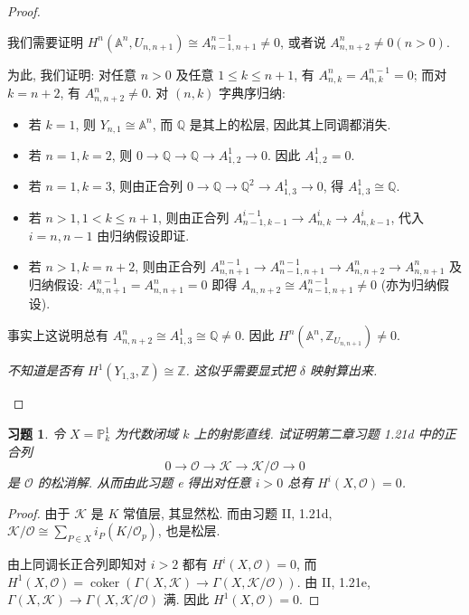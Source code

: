 \documentclass{article}
\theoremstyle{exercise}
\newtheorem{exercise}{习题}[section]
\theoremstyle{theorem}
\theoremstyle{remark}
\def\A{\mathbb{A}}
\def\P{\mathbb{P}}
\def\Z{\mathbb{Z}}
\def\Q{\mathbb{Q}}
\def\cO{\mathscr{O}}
\def\cK{\mathscr{K}}
\def\coker{\operatorname{coker}}
\def\leq{\leqslant}
\begin{document}
\begin{proof}
\begin{enumerate}
          我们需要证明 $H^n(\A^n, U_{n, n+1}) \cong A_{n-1, n+1}^{n-1} \neq 0$, 或者说 $A_{n, n+2}^n \neq 0 (n > 0)$.

          为此, 我们证明: 对任意 $n > 0$ 及任意 $1 \leq k \leq n + 1$, 有 $A_{n, k}^n = A_{n, k}^{n-1} = 0$;
          而对 $k = n + 2$, 有 $A_{n, n+2}^n \neq 0$.
          对 $(n, k)$ 字典序归纳:
          \begin{itemize}
            \item 若 $k = 1$, 则 $Y_{n, 1} \cong \A^n$, 而 $\Q$ 是其上的松层, 因此其上同调都消失.
            \item 若 $n = 1, k = 2$, 则 $0 \to \Q \to \Q \to A_{1, 2}^1 \to 0$. 因此 $A_{1, 2}^1 = 0$.
            \item 若 $n = 1, k = 3$, 则由正合列 $0 \to \Q \to \Q^2 \to A_{1, 3}^1 \to 0$, 得 $A_{1, 3}^1 \cong \Q$.
            \item 若 $n > 1, 1 < k \leq n + 1$,
                  则由正合列 $A_{n-1, k-1}^{i-1} \to A_{n, k}^i \to A_{n, k-1}^i$,
                  代入 $i = n, n-1$ 由归纳假设即证.
            \item 若 $n > 1, k = n + 2$, 则由正合列 $A_{n, n+1}^{n-1} \to A_{n-1, n+1}^{n-1} \to A_{n, n+2}^n \to A_{n, n+1}^n$
                  及归纳假设: $A_{n, n+1}^{n-1} = A_{n, n+1}^n = 0$ 即得 $A_{n, n+2} \cong A_{n-1, n+1}^{n-1} \neq 0$ (亦为归纳假设).
          \end{itemize}
          事实上这说明总有 $A_{n, n+2}^n \cong A_{1, 3}^1 \cong \Q \neq 0$.
          因此 $H^n(\A^n, \Z_{U_{n, n+1}}) \neq 0$.

          \textit{不知道是否有 $H^1(Y_{1, 3}, \Z) \cong \Z$. 这似乎需要显式把 $\delta$ 映射算出来.}
          \qedhere
  \end{enumerate}
\end{proof}

\begin{exercise}
  令 $X = \P_k^1$ 为代数闭域 $k$ 上的射影直线.
  试证明第二章习题 1.21d 中的正合列
  \[ 0 \to \cO \to \cK \to \cK / \cO \to 0 \]
  是 $\cO$ 的松消解. 从而由此习题 e 得出对任意 $i > 0$ 总有 $H^i(X, \cO) = 0$.
\end{exercise}

\begin{proof}
  由于 $\cK$ 是 $K$ 常值层, 其显然松.
  而由习题  II, 1.21d, $\cK / \cO \cong \sum_{P \in X} i_P(K / \cO_p)$,
  也是松层.

  由上同调长正合列即知对 $i > 2$ 都有 $H^i(X, \cO) = 0$,
  而 $H^1(X, \cO) = \coker(\Gamma(X, \cK) \to \Gamma(X, \cK / \cO))$.
  由 II, 1.21e, $\Gamma(X, \cK) \to \Gamma(X, \cK / \cO)$ 满. 因此 $H^1(X, \cO) = 0$.
\end{proof}
\end{document}

